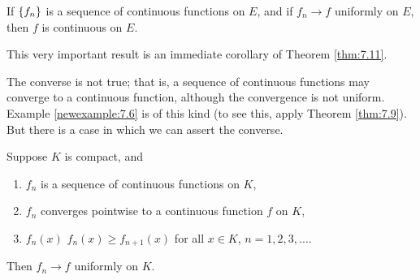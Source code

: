 
\begin{thm}
    \label{thm:7.12}
    If $\protect\{f_n\}$ is a sequence of continuous functions on $E$, 
    and if $f_n \rightarrow f$ 
    uniformly on $E$, then $f$ is continuous on $E$.
\end{thm}

This very important result is an immediate corollary of Theorem \ref{thm:7.11}.

The converse is not true; 
that is, a sequence of continuous functions may converge to a continuous function, although the convergence is not uniform.
Example \ref{newexample:7.6} is of this kind 
(to see this, apply Theorem \ref{thm:7.9}). 
But there is a case in which we can assert the converse.

\begin{thm}
    \label{thm:7.13}
    Suppose $K$ is compact, and
    \begin{enumerate}
        \item ${f_n}$ is a sequence of continuous functions on $K$,
        \item ${f_n}$ converges pointwise to a continuous function $f$ on $K$,
        \item $f_n(x)$ $f_n(x) \geq f_{n+1}(x)$ for all $x \in K$, $n = 1, 2, 3, ...$.
    \end{enumerate}
    Then $f_n \rightarrow f$ uniformly on $K$.
\end{thm}

